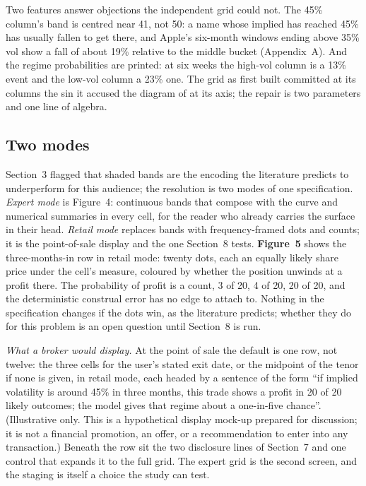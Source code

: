 \documentclass[11pt,a4paper]{article}
\begin{document}
Two features answer objections the independent grid could not. The 45\% column's band is centred near 41, not 50: a name whose implied has reached 45\% has usually fallen to get there, and Apple's six-month windows ending above 35\% vol show a fall of about 19\% relative to the middle bucket (Appendix~A). And the regime probabilities are printed: at six weeks the high-vol column is a 13\% event and the low-vol column a 23\% one. The grid as first built committed at its columns the sin it accused the diagram of at its axis; the repair is two parameters and one line of algebra.

\subsection{Two modes}

Section~3 flagged that shaded bands are the encoding the literature predicts to underperform for this audience; the resolution is two modes of one specification. \emph{Expert mode} is Figure~4: continuous bands that compose with the curve and numerical summaries in every cell, for the reader who already carries the surface in their head. \emph{Retail mode} replaces bands with frequency-framed dots and counts; it is the point-of-sale display and the one Section~8 tests. \textbf{Figure~5} shows the three-months-in row in retail mode: twenty dots, each an equally likely share price under the cell's measure, coloured by whether the position unwinds at a profit there. The probability of profit is a count, 3 of 20, 4 of 20, 20 of 20, and the deterministic construal error has no edge to attach to. Nothing in the specification changes if the dots win, as the literature predicts; whether they do for this problem is an open question until Section~8 is run.

\emph{What a broker would display.} At the point of sale the default is one row, not twelve: the three cells for the user's stated exit date, or the midpoint of the tenor if none is given, in retail mode, each headed by a sentence of the form ``if implied volatility is around 45\% in three months, this trade shows a profit in 20 of 20 likely outcomes; the model gives that regime about a one-in-five chance''. (Illustrative only. This is a hypothetical display mock-up prepared for discussion; it is not a financial promotion, an offer, or a recommendation to enter into any transaction.) Beneath the row sit the two disclosure lines of Section~7 and one control that expands it to the full grid. The expert grid is the second screen, and the staging is itself a choice the study can test.
\end{document}
